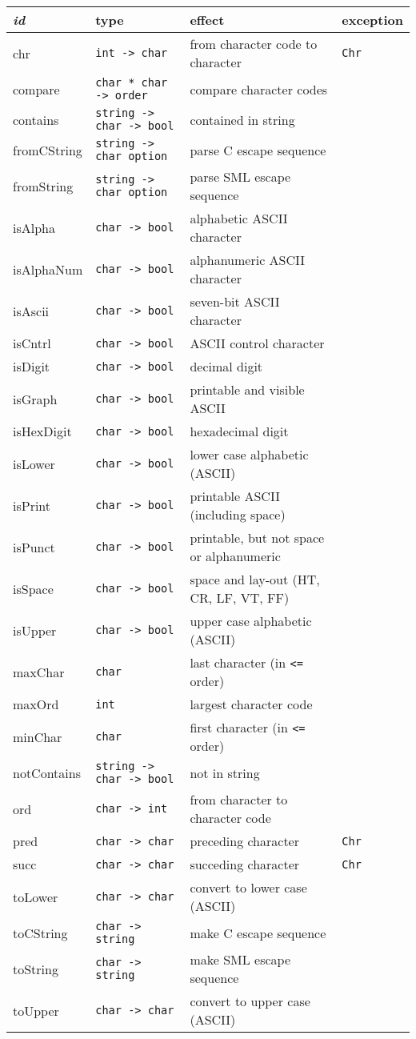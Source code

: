 \documentclass[fleqn,a4paper]{article}
\begin{document}
\begin{tabular}{@{\tt\ \ }llll}\hline
{\it id\/}  & type &     effect & exception \\\hline

chr & {\tt int  -> char} & from character code to character & {\tt Chr}\\
compare & {\tt char * char -> order} & compare character codes \\
contains & {\tt string -> char -> bool} & contained in string\\
fromCString & {\tt string -> char option} & parse C escape sequence\\
fromString & {\tt string -> char option} & parse SML escape sequence\\
isAlpha    & {\tt char -> bool}   & alphabetic ASCII character \\
isAlphaNum & {\tt char -> bool}   & alphanumeric ASCII character\\
isAscii    & {\tt char -> bool}   & seven-bit ASCII character \\ 
isCntrl    & {\tt char -> bool}   & ASCII control character \\
isDigit    & {\tt char -> bool}   & decimal digit \\
isGraph    & {\tt char -> bool}   & printable and visible ASCII \\
isHexDigit & {\tt char -> bool}   & hexadecimal digit \\
isLower    & {\tt char -> bool}   & lower case alphabetic (ASCII) \\
isPrint    & {\tt char -> bool}   & printable ASCII (including space) \\
isPunct    & {\tt char -> bool}   & printable, but not space or alphanumeric \\
isSpace    & {\tt char -> bool}   & space and lay-out (HT, CR, LF, VT, FF) \\
isUpper    & {\tt char -> bool}   & upper case alphabetic (ASCII) \\
maxChar    & {\tt char} & last character (in {\tt <=} order)\\
maxOrd     & {\tt int} & largest character code\\
minChar    & {\tt char} & first character (in {\tt <=} order)\\
notContains & {\tt string -> char -> bool} & not in string\\
ord & {\tt char -> int} & from character to character code \\
pred & {\tt char -> char} & preceding character & {\tt Chr}\\
succ & {\tt char -> char} & succeding character & {\tt Chr}\\
toLower    & {\tt char -> char} & convert to lower case (ASCII) \\
toCString  & {\tt char -> string} & make C escape sequence \\
toString   & {\tt char -> string} & make SML escape sequence \\
toUpper    & {\tt char -> char} & convert to upper case (ASCII) \\\hline
\end{tabular}
\end{document}
